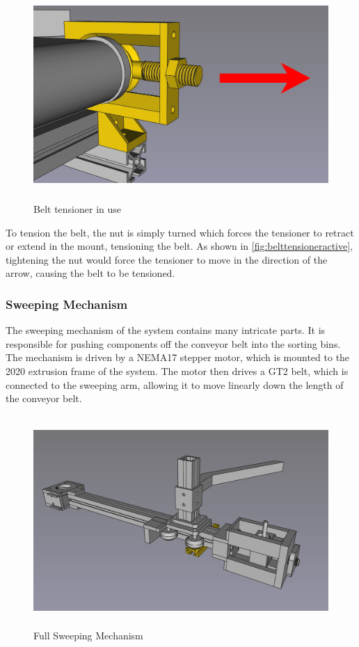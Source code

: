\begin{figure}[H]
    \begin{minipage}[h]{0.95\textwidth}
        \centering
        \includegraphics[height=8cm]{imgs/freecad/tensionerapplication.jpg}
        \caption{Belt tensioner in use}
        \label{fig:belttensioneractive}
    \end{minipage}
\end{figure}

To tension the belt, the nut is simply turned which forces the tensioner to retract or extend in the mount, tensioning the belt. As shown in \autoref{fig:belttensioneractive}, tightening the nut would force the tensioner to move in the direction of the arrow, causing the belt to be tensioned.

\subsubsection{Sweeping Mechanism}
The sweeping mechanism of the system contains many intricate parts. It is responsible for pushing components off the conveyor belt into the sorting bins. The mechanism is driven by a NEMA17 stepper motor, which is mounted to the 2020 extrusion frame of the system. The motor then drives a GT2 belt, which is connected to the sweeping arm, allowing it to move linearly down the length of the conveyor belt. 
\begin{figure}[H]
    \begin{minipage}[h]{0.95\textwidth}
        \centering
        \includegraphics[height=8cm]{imgs/freecad/fullsweeper.jpg}
        \caption{Full Sweeping Mechanism}
        \label{fig:sweeperfull}
    \end{minipage}
\end{figure}

